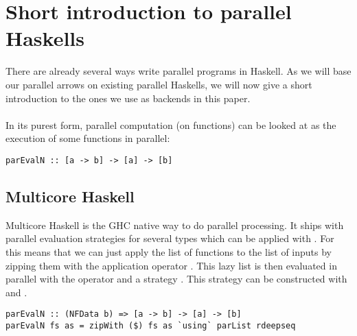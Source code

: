 \section{Short introduction to parallel Haskells}
There are already several ways write parallel programs in Haskell. As we will base our parallel arrows on existing parallel Haskells, we will now give a short introduction to the ones we use as backends in this paper.
\\\\
In its purest form, parallel computation (on functions) can be looked at as the execution of some functions  in parallel:
\begin{lstlisting}[frame=htrbl]
parEvalN :: [a -> b] -> [a] -> [b]
\end{lstlisting}

\subsection{Multicore Haskell}
Multicore Haskell \cite{multicore_hackage} is the GHC native way to do parallel processing. It ships with parallel evaluation strategies for several types which can be applied with . For  this means that we can just apply the list of functions \code{[a -> b]} to the list of inputs \code{[a]} by zipping them with the application operator \code{\$}. This lazy list \code{[b]} is then evaluated in parallel with the  operator and a strategy . This strategy can be constructed with  and .
\begin{lstlisting}[frame=htrbl]
parEvalN :: (NFData b) => [a -> b] -> [a] -> [b]
parEvalN fs as = zipWith ($) fs as `using` parList rdeepseq
\end{lstlisting}

